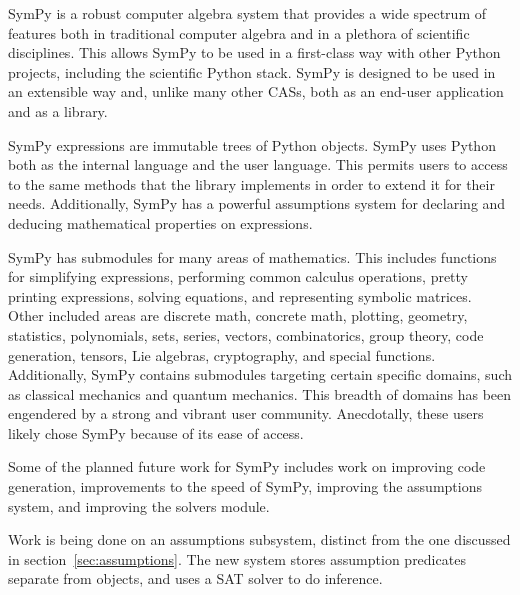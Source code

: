 SymPy is a robust computer algebra system that provides a wide spectrum of
features both in traditional computer algebra and in a plethora of scientific
disciplines. This allows SymPy to be used in a first-class way with other
Python projects, including the scientific Python stack. SymPy is designed to
be used in an extensible way and, unlike many other CASs, both as an end-user
application and as a library.

SymPy expressions are immutable trees of Python objects. SymPy uses Python both
as the internal language and the user language. This permits users to access to
the same
methods that the library implements in order to extend it for their needs.
Additionally, SymPy has a powerful assumptions
system for declaring and deducing mathematical properties on expressions.

SymPy has submodules for many areas of mathematics. This includes functions for
simplifying expressions, performing common calculus operations, pretty printing
expressions, solving equations, and representing symbolic matrices. Other included
areas
are discrete math, concrete math, plotting, geometry, statistics,
polynomials, sets, series, vectors, combinatorics, group theory, code
generation, tensors, Lie algebras, cryptography, and special functions.
Additionally, SymPy contains submodules targeting certain specific domains,
such as classical mechanics and quantum mechanics.  This breadth of domains has
been engendered by a strong and vibrant user community.
Anecdotally, these users likely chose SymPy because of its ease of access.


Some of the planned future work for SymPy includes work on improving code
generation, improvements to the speed of SymPy, improving the assumptions
system, and improving the solvers module.


Work is being done on an assumptions subsystem, distinct from the one
discussed in section~\ref{sec:assumptions}. The new system stores assumption
predicates separate from objects, and uses a SAT solver to do inference.


